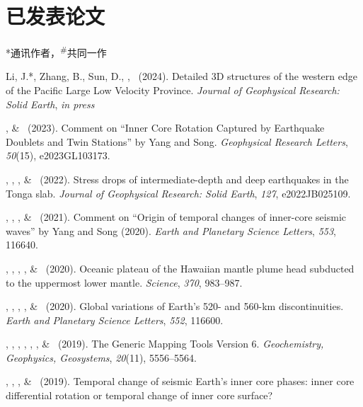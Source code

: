 \section{已发表论文}
\newcommand{\Revision}{\emph{正在审稿}}
\newcommand{\CS}{*} %
\newcommand{\CF}{\textsuperscript{\#}} %

\CS 通讯作者，\CF 共同一作
\begin{etaremune}
\item Li, J.\CS, Zhang, B., Sun, D., \Me, \JYao\ (2024).
    Detailed 3D structures of the western edge of the Pacific Large Low Velocity Province.
    \emph{Journal of Geophysical Research: Solid Earth}, \emph{in press}
\item \Me\CS, \& \LWen\ (2023).
    Comment on ``Inner Core Rotation Captured by Earthquake Doublets and Twin Stations'' by Yang and Song.
    \emph{Geophysical Research Letters}, \emph{50}(15), e2023GL103173.
\item \Me\CS, \SWei\CS, \WWang, \& \FWang\ (2022).
    Stress drops of intermediate-depth and deep earthquakes in the Tonga slab.
    \emph{Journal of Geophysical Research: Solid Earth}, \emph{127}, e2022JB025109.
\item \JYao\CS, \Me, \LSun, \& \LWen\ (2021).
    Comment on ``Origin of temporal changes of inner-core seismic waves'' by Yang and Song (2020).
    \emph{Earth and Planetary Science Letters}, \emph{553}, 116640.
\item \SWei\CS, \PShearer, \CLithgowBertelloni, \LStixrude, \& \Me\ (2020).
    Oceanic plateau of the Hawaiian mantle plume head subducted to the uppermost lower mantle.
    \emph{Science}, \emph{370}, 983--987.
\item \Me\CS, \MLv, \SWei, \SDorfman, \& \PShearer\ (2020).
    Global variations of Earth's 520- and 560-km discontinuities.
    \emph{Earth and Planetary Science Letters}, \emph{552}, 116600. \\
\item
    \PWessel\CS, \JLuis, \LUieda, \RScharroo, \FWobbe, \WSmith, \& \Me\ (2019).
    The Generic Mapping Tools Version 6.
    \emph{Geochemistry, Geophysics, Geosystems}, \emph{20}(11), 5556--5564.
\item
    \JYao\CS, \Me, \LSun, \& \LWen\ (2019).
    Temporal change of seismic Earth's inner core phases: inner core differential rotation or temporal change of inner core surface?

\end{etaremune}

